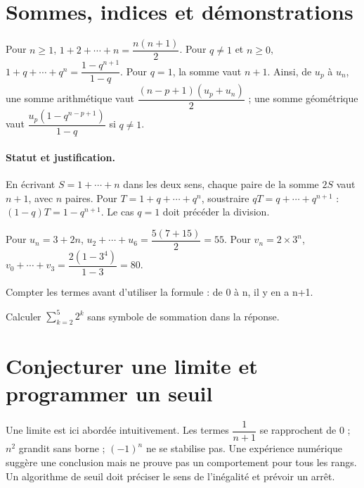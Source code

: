 \section{Sommes, indices et démonstrations}\label{C01-U4}
\begin{keypoint}
Pour $n\geq1$, $1+2+\cdots +n=\dfrac{n(n+1)}{2}$. Pour $q\ne1$ et $n\geq0$, $1+q+\cdots +q^n=\dfrac{1-q^{n+1}}{1-q}$. Pour $q=1$, la somme vaut $n+1$. Ainsi, de $u_p$ à $u_n$, une somme arithmétique vaut $\dfrac{(n-p+1)(u_p+u_n)}{2}$ ; une somme géométrique vaut $\dfrac{u_p(1-q^{n-p+1})}{1-q}$ si $q\ne1$.
\end{keypoint}
\paragraph{Statut et justification.} En écrivant $S=1+\cdots+n$ dans les deux sens, chaque paire de la somme $2S$ vaut $n+1$, avec $n$ paires. Pour $T=1+q+\cdots+q^n$, soustraire $qT=q+\cdots+q^{n+1}$ : $(1-q)T=1-q^{n+1}$. Le cas $q=1$ doit précéder la division.
\begin{example}Pour $u_n=3+2n$, $u_2+\cdots +u_6=\dfrac{5(7+15)}{2}=55$. Pour $v_n=2\times3^n$, $v_0+\cdots +v_3=\dfrac{2(1-3^4)}{1-3}=80$.\end{example}\label{C01-EX4}
\begin{pitfall}Compter les termes avant d’utiliser la formule : de 0 à n, il y en a n+1.\end{pitfall}
\begin{application}Calculer $\sum_{k=2}^{5}2^k$ sans symbole de sommation dans la réponse.\end{application}\label{C01-AP4}
\section{Conjecturer une limite et programmer un seuil}\label{C01-U5}
\begin{keypoint}
Une limite est ici abordée intuitivement. Les termes $\dfrac{1}{n+1}$ se rapprochent de 0 ; $n^2$ grandit sans borne ; $(-1)^n$ ne se stabilise pas. Une expérience numérique suggère une conclusion mais ne prouve pas un comportement pour tous les rangs. Un algorithme de seuil doit préciser le sens de l’inégalité et prévoir un arrêt.
\end{keypoint}
